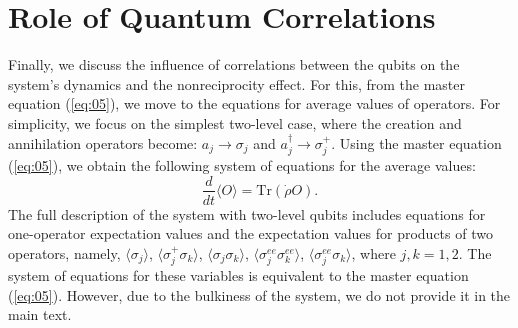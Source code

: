 \documentclass[lettersize,journal]{IEEEtran}
\begin{document}
\section{Role of Quantum Correlations}

Finally, we discuss the influence of correlations between the qubits on the system's dynamics and the nonreciprocity effect.
For this, from the master equation (\ref{eq:05}), we move to the equations for average values of operators.
For simplicity, we focus on the simplest two-level case, where the creation and annihilation operators become: $a_j \rightarrow \sigma_j$ and $a_j^\dag \rightarrow \sigma_j^+$.
Using the master equation (\ref{eq:05}), we obtain the following system of equations for the average values:
\begin{equation} \label{eq:23}
    \frac{d}{dt}\langle O \rangle = \mathrm{Tr}\left( \dot{\rho} O \right).
\end{equation}
The full description of the system with two-level qubits includes equations for one-operator expectation values and the expectation values for products of two operators, namely, $\langle \sigma_j \rangle$, $\langle \sigma_j^+ \sigma_k \rangle$, $\langle \sigma_j \sigma_k \rangle$, $\langle \sigma_j^{ee} \sigma_k^{ee} \rangle$, $\langle \sigma_j^{ee} \sigma_k \rangle$, where $j,k = 1, 2$.
The system of equations for these variables is equivalent to the master equation (\ref{eq:05}).
However, due to the bulkiness of the system, we do not provide it in the main text.
\end{document}
